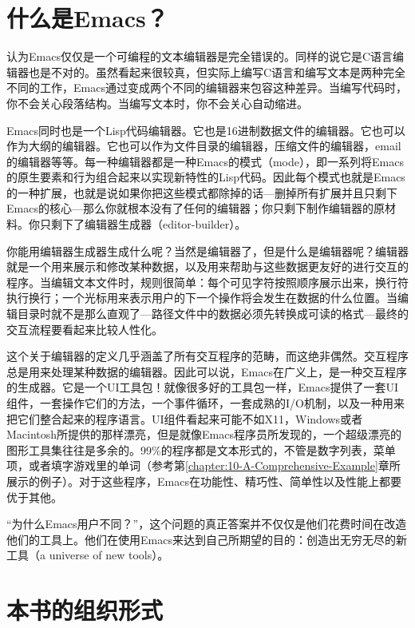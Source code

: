 \section{什么是Emacs？}
\label{section:00-What-Is-Emacs}

认为Emacs仅仅是一个可编程的文本编辑器是完全错误的。同样的说它是C语言编辑器也是不对的。虽然看起来很较真，但实际上编写C语言和编写文本是两种完全不同的工作，Emacs通过变成两个不同的编辑器来包容这种差异。当编写代码时，你不会关心段落结构。当编写文本时，你不会关心自动缩进。

Emacs同时也是一个Lisp代码编辑器。它也是16进制数据文件的编辑器。它也可以作为大纲的编辑器。它也可以作为文件目录的编辑器，压缩文件的编辑器，email的编辑器等等。每一种编辑器都是一种Emacs的模式（mode），即一系列将Emacs的原生要素和行为组合起来以实现新特性的Lisp代码。因此每个模式也就是Emacs的一种扩展，也就是说如果你把这些模式都除掉的话---删掉所有扩展并且只剩下Emacs的核心---那么你就根本没有了任何的编辑器；你只剩下制作编辑器的原材料。你只剩下了编辑器生成器（editor-builder）。

你能用编辑器生成器生成什么呢？当然是编辑器了，但是什么是编辑器呢？编辑器就是一个用来展示和修改某种数据，以及用来帮助与这些数据更友好的进行交互的程序。当编辑文本文件时，规则很简单：每个可见字符按照顺序展示出来，换行符执行换行；一个光标用来表示用户的下一个操作将会发生在数据的什么位置。当编辑目录时就不是那么直观了---路径文件中的数据必须先转换成可读的格式---最终的交互流程要看起来比较人性化。

这个关于编辑器的定义几乎涵盖了所有交互程序的范畴，而这绝非偶然。交互程序总是用来处理某种数据的编辑器。因此可以说，Emacs在广义上，是一种交互程序的生成器。它是一个UI工具包！就像很多好的工具包一样，Emacs提供了一套UI组件，一套操作它们的方法，一个事件循环，一套成熟的I/O机制，以及一种用来把它们整合起来的程序语言。UI组件看起来可能不如X11，Windows或者Macintosh所提供的那样漂亮，但是就像Emacs程序员所发现的，一个超级漂亮的图形工具集往往是多余的。99\%的程序都是文本形式的，不管是数字列表，菜单项，或者填字游戏里的单词（参考第\ref{chapter:10-A-Comprehensive-Example}章所展示的例子）。对于这些程序，Emacs在功能性、精巧性、简单性以及性能上都要优于其他。

“为什么Emacs用户不同？”，这个问题的真正答案并不仅仅是他们花费时间在改造他们的工具上。他们在使用Emacs来达到自己所期望的目的：创造出无穷无尽的新工具（a universe of new tools）。

\section{本书的组织形式}
\label{section:00-Organization-of-This-Book}

